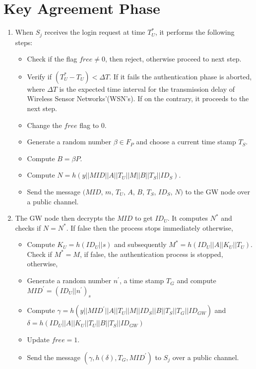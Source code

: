 \documentclass[a4paper,12pt]{report}
\begin{document}
\section{Key Agreement Phase}
\begin{enumerate}
\item When $S_{j}$ receives the login request at time $T_{U}^{*}$, it
performs the following steps:


\begin{itemize}
\item Check if the flag $free \neq 0$, then reject, otherwise proceed
to next step.
\item Verify if $(T_{U}^{*}-T_{U})<\Delta T$. If it fails the authentication phase is aborted,
where $\Delta T$ is the expected time interval for the transmission
delay of Wireless Sensor Networks'(WSN's). If on the contrary, it
proceeds to the next step.
\item Change the $free$ flag to 0.
\item Generate a random number $\beta \in F_{P}$ and choose a current time stamp $T_{S}$.
\item Compute $B = \beta P$.
\item Compute $N = h(y||MID||A||T_{U}||M||B||T_{S}||ID_{S})$.
\item Send the message $(MID$, $m$, $T_{U}$, $A$, $B$, $T_{S}$, $ID_{S}$, $N)$ to the GW node over a public channel.
\end{itemize}

\item The GW node then decrypts the $MID$ to get $ID_U$. It computes $N^*$ and checks if $N = N^*$. If false then the process stops immediately otherwise,
\begin{itemize}
\item Compute $K_{U} = h(ID_{U}||s)$ and subsequently $M^{*} = h(ID_{U}||A||K_{U}||T_{U})$. Check if $M^{*} = M$, if false, the authentication process is stopped, otherwise,
\item Generate a random number $n^{\prime}$, a time stamp $T_{G}$ and compute $MID^{\prime} = (ID_{U}||n^{\prime})_s$
\item Compute $\gamma = h(y||MID^{\prime}||A||T_U||M||ID_S||B||T_S||T_G||ID_{GW})$ and \\$\delta = h(ID_U||A||K_U|| T_U ||B||T_S||ID_{GW})$
\item Update $free=1$.
\item Send the message $(\gamma, h(\delta), T_G, MID^{\prime})$ to $S_{j}$ over a public channel.\\
\end{itemize}


\end{enumerate}
\end{document}
